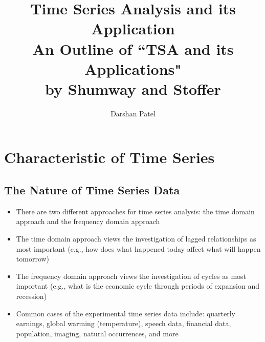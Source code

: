 \documentclass[12pt]{article}
\begin{document}
\theoremstyle{definition}
\newtheorem{theorem}{Theorem}[section]
\newtheorem{definition}{Definition}[section]
\newtheorem{example}{Example}[section]

\title{Time Series Analysis and its Application \\ \Large An Outline of ``TSA and its Applications" \\ by Shumway and Stoffer}
\author{Darshan Patel}
\maketitle

\tableofcontents 

\newpage
\section{Characteristic of Time Series}
\subsection{The Nature of Time Series Data}
\begin{itemize}
\item There are two different approaches for time series analysis: the time domain approach and the frequency domain approach
\item The time domain approach views the investigation of lagged relationships as most important (e.g., how does what happened today affect what will happen tomorrow)
\item The frequency domain approach views the investigation of cycles as most important (e.g., what is the economic cycle through periods of expansion and recession)
\item Common cases of the experimental time series data include: quarterly earnings, global warming (temperature), speech data, financial data, population, imaging, natural occurrences, and more
\end{itemize}
\end{document}
